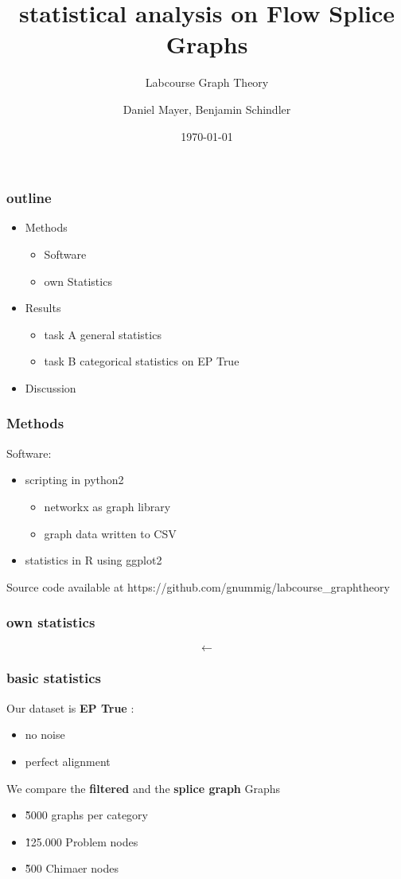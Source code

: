 \documentclass[10pt, compress]{beamer}
\title{statistical analysis on Flow Splice Graphs}
\subtitle{Labcourse Graph Theory}
\date{\today}
\author{Daniel Mayer, Benjamin Schindler}
\institute{University of Leipzig}
\begin{document}
\maketitle

\begin{frame}[fragile]
  \frametitle{outline}
\begin{itemize}
	\item  Methods
	\begin{itemize}
		\item Software
		\item own Statistics
	\end{itemize}
	\item Results
	\begin{itemize}
		\item task A general statistics
		\item task B categorical statistics on EP True 
	\end{itemize}
	\item Discussion
\end{itemize}
\end{frame}
\begin{frame}[fragile]
	\frametitle{Methods}
	Software:
	\begin{itemize}
		\item scripting in python2
			\begin{itemize}
				\item networkx as graph library
				\item graph data written to CSV
			\end{itemize}
		\item statistics in R using ggplot2
	\end{itemize}
	Source code available at https://github.com/gnummig/labcourse\_graphtheory
\end{frame}
\begin{frame}[fragile]
	\frametitle{own statistics }
	\begin{equation*}
	\leftarrow	
	\end{equation*}
\end{frame}
\begin{frame}[fragile]
	\frametitle{basic statistics}
	Our dataset is \textbf{EP True} :
	\begin{itemize}
		\item no noise	
		\item perfect alignment
	\end{itemize}
	We compare the \textbf{filtered} and the \textbf{splice graph} Graphs
	\begin{itemize}
		\item \~5000 graphs per category
		\item \~125.000 Problem nodes
		\item \~500 Chimaer nodes
	\end{itemize}

\end{frame}
\end{document}

